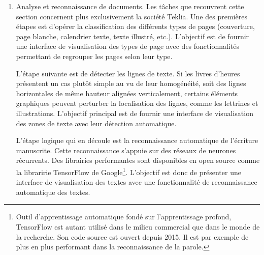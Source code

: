 \documentclass[a4paper,12pt,twoside]{book}
\begin{document}
\begin{enumerate}
	    La troisième sous-étape concerne des problématiques plus amplement abordées lors du stage : le modèle de données et l'unicité du format afin de garantir l'interopérabilité. Si l'affichage des manuscrits se fait selon le protocole IIIf, leur texte est encodé selon un modèle bien précis respectant la TEI, soit un schéma défini dans un document ODD comme nous l'avons présenté pour l'encodage des métadonnées, en l'occurrence des notices de livres d'heures conservées à la BnF. 
	    
	    La dernière sous-étape est la publication d'une interface graphique afin de saisir, visualiser et corriger les données si nécessaire, affiner la table de structure et les textes de référence\footcite[p. 11-13]{HORAE_projet}. On peut par exemple penser au mode auteur du logiciel Oxygen XML Editor qui permet de voir et modifier les données affichées de manière plus claire et limpide, sans balises, avec une présentation personnalisable grâce à la modification de la CSS et des frameworks du logiciel.\\ 
	    
	    \item \og Analyse et reconnaissance de documents\fg{}. Les tâches que recouvrent cette section concernent plus exclusivement la société Teklia. Une des premières étapes est d'opérer la classification des différents types de pages (couverture, page blanche, calendrier texte, texte illustré, etc.). L'objectif est de fournir une interface de visualisation des types de page avec des fonctionnalités permettant de regrouper les pages selon leur type. 
	    
	    L'étape suivante est de détecter les lignes de texte. Si les livres d'heures présentent un cas plutôt simple au vu de leur homogénéité, soit des lignes horizontales de même hauteur alignées verticalement, certains éléments graphiques peuvent perturber la localisation des lignes, comme les lettrines et illustrations. L'objectif principal est de fournir une interface de visualisation des zones de texte avec leur détection automatique. 
	    
	    L'étape logique qui en découle est la reconnaissance automatique de l'écriture manuscrite. Cette reconnaissance s'appuie sur des réseaux de neurones récurrents. Des librairies performantes sont disponibles en open source comme la libraririe TensorFlow de Google\footnote{Outil d'apprentissage automatique fondé sur l'apprentissage profond, TensorFlow est autant utilisé dans le milieu commercial que dans le monde de la recherche. Son code source est ouvert depuis 2015. Il est par exemple de plus en plus performant dans la reconnaissance de la parole.}. L'objectif est donc de présenter une interface de visualisation des textes avec une fonctionnalité de reconnaissance automatique des textes. 
	    

\end{enumerate}
\end{document}
